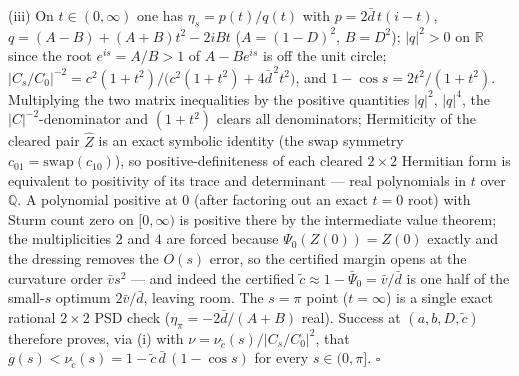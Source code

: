 \documentclass[
]{article}
\begin{document}
(iii) On $t\in(0,\infty)$ one has $\eta_s=p(t)/q(t)$ with
$p=2\bar d\,t(i-t)$, $q=(A-B)+(A+B)t^2-2iBt$ ($A=(1-D)^2$, $B=D^2$);
$|q|^2>0$ on $\mathbb R$ since the root $e^{is}=A/B>1$ of $A-Be^{is}$ is off
the unit circle; $|C_s/C_0|^{-2}=c^2(1+t^2)/\bigl(c^2(1+t^2)+4\bar
d^{\,2}t^2\bigr)$, and $1-\cos s=2t^2/(1+t^2)$. Multiplying the two matrix
inequalities by the positive quantities $|q|^2$, $|q|^4$, the
$|C|^{-2}$-denominator and $(1+t^2)$ clears all denominators; Hermiticity
of the cleared pair $\widehat Z$ is an exact symbolic identity (the swap
symmetry $c_{01}=\mathrm{swap}(c_{10})$), so positive-definiteness of each
cleared $2\times2$ Hermitian form is equivalent to positivity of its trace
and determinant --- real polynomials in $t$ over $\mathbb Q$. A polynomial
positive at $0$ (after factoring out an exact $t=0$ root) with Sturm count
zero on $[0,\infty)$ is positive there by the intermediate value theorem;
the multiplicities $2$ and $4$ are forced because
$\Psi_0(Z(0))=Z(0)$ exactly and the dressing removes the $O(s)$ error, so
the certified margin opens at the curvature order $\bar vs^2$ --- and
indeed the certified $\tilde c\approx1-\bar\Psi_0=\bar v/\bar d$ is
one half of the small-$s$ optimum $2\bar v/\bar d$, leaving room. The
$s=\pi$ point ($t=\infty$) is a single exact rational $2\times2$ PSD check
($\eta_\pi=-2\bar d/(A+B)$ real). Success at $(a,b,D,\tilde c)$ therefore
proves, via (i) with $\nu=\nu_{\tilde c}(s)/|C_s/C_0|^2$, that
$g(s)<\nu_{\tilde c}(s)=1-\tilde c\,\bar d\,(1-\cos s)$ for every
$s\in(0,\pi]$. $\square$
\end{document}
